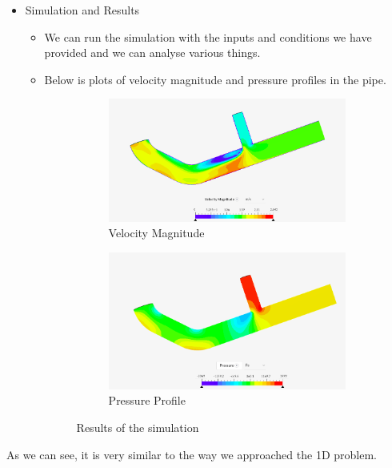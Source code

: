 \documentclass[12pt]{article}
\begin{document}
\begin{itemize}
\begin{itemize}
    \end{itemize}
    \item Simulation and Results
    \begin{itemize}
        \item We can run the simulation with the inputs and conditions we have provided and we can analyse various things.
        \item Below is plots of velocity magnitude and pressure profiles in the pipe.
        \begin{figure}[hbt!]
\centering
\begin{subfigure}{0.4\textwidth}
  \centering
  \includegraphics[width=0.9\linewidth]{plot6.png}
  \caption{Velocity Magnitude}
  \label{fig:sub1}
\end{subfigure}%
\begin{subfigure}{0.4\textwidth}
  \centering
  \includegraphics[width=0.9\linewidth]{plot7.png}
  \caption{Pressure Profile}
  \label{fig:sub2}
\end{subfigure}
\caption{Results of the simulation}
\label{fig:test}
\end{figure}
\FloatBarrier 
    \end{itemize}
\end{itemize}

As we can see, it is very similar to the way we approached the 1D problem.
\end{document}
